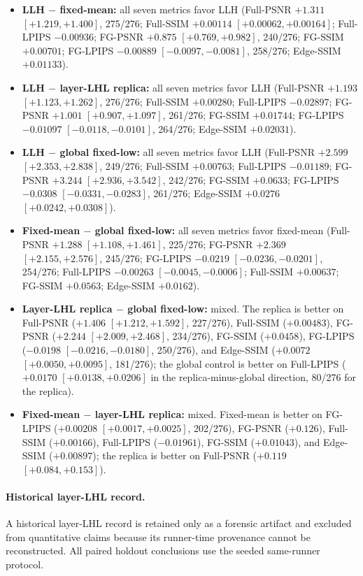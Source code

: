 \documentclass[10pt]{article}
\begin{document}
\begin{itemize}
\item \textbf{LLH $-$ fixed-mean:} all seven metrics favor LLH
  (Full-PSNR $+1.311$ $[+1.219,+1.400]$, 275/276; Full-SSIM $+0.00114$
  $[+0.00062,+0.00164]$; Full-LPIPS $-0.00936$; FG-PSNR $+0.875$
  $[+0.769,+0.982]$, 240/276; FG-SSIM $+0.00701$; FG-LPIPS $-0.00889$
  $[-0.0097,-0.0081]$, 258/276; Edge-SSIM $+0.01133$).
\item \textbf{LLH $-$ layer-LHL replica:} all seven metrics favor LLH
  (Full-PSNR $+1.193$ $[+1.123,+1.262]$, 276/276; Full-SSIM $+0.00280$;
  Full-LPIPS $-0.02897$; FG-PSNR $+1.001$ $[+0.907,+1.097]$, 261/276;
  FG-SSIM $+0.01744$; FG-LPIPS $-0.01097$ $[-0.0118,-0.0101]$, 264/276;
  Edge-SSIM $+0.02031$).
\item \textbf{LLH $-$ global fixed-low:} all seven metrics favor LLH
  (Full-PSNR $+2.599$ $[+2.353,+2.838]$, 249/276; Full-SSIM $+0.00763$;
  Full-LPIPS $-0.01189$; FG-PSNR $+3.244$ $[+2.936,+3.542]$, 242/276;
  FG-SSIM $+0.0633$; FG-LPIPS $-0.0308$ $[-0.0331,-0.0283]$, 261/276;
  Edge-SSIM $+0.0276$ $[+0.0242,+0.0308]$).
\item \textbf{Fixed-mean $-$ global fixed-low:} all seven metrics favor
  fixed-mean (Full-PSNR $+1.288$ $[+1.108,+1.461]$, 225/276; FG-PSNR
  $+2.369$ $[+2.155,+2.576]$, 245/276; FG-LPIPS $-0.0219$
  $[-0.0236,-0.0201]$, 254/276; Full-LPIPS $-0.00263$
  $[-0.0045,-0.0006]$; Full-SSIM $+0.00637$; FG-SSIM $+0.0563$;
  Edge-SSIM $+0.0162$).
\item \textbf{Layer-LHL replica $-$ global fixed-low:} mixed. The replica is
  better on Full-PSNR ($+1.406$ $[+1.212,+1.592]$, 227/276), Full-SSIM
  ($+0.00483$), FG-PSNR ($+2.244$ $[+2.009,+2.468]$, 234/276), FG-SSIM
  ($+0.0458$), FG-LPIPS ($-0.0198$ $[-0.0216,-0.0180]$, 250/276), and
  Edge-SSIM ($+0.0072$ $[+0.0050,+0.0095]$, 181/276); the global control is
  better on Full-LPIPS ($+0.0170$ $[+0.0138,+0.0206]$ in the
  replica-minus-global direction, 80/276 for the replica).
\item \textbf{Fixed-mean $-$ layer-LHL replica:} mixed. Fixed-mean is better
  on FG-LPIPS ($+0.00208$ $[+0.0017,+0.0025]$, 202/276), FG-PSNR ($+0.126$),
  Full-SSIM ($+0.00166$), Full-LPIPS ($-0.01961$), FG-SSIM ($+0.01043$), and
  Edge-SSIM ($+0.00897$); the replica is better on Full-PSNR ($+0.119$
  $[+0.084,+0.153]$).
\end{itemize}

\paragraph{Historical layer-LHL record.} A historical layer-LHL record is
retained only as a forensic artifact and excluded from quantitative claims
because its runner-time provenance cannot be reconstructed. All paired
holdout conclusions use the seeded same-runner protocol.
\end{document}
